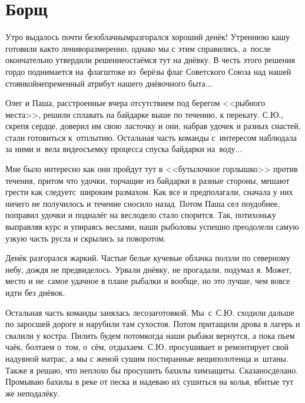 \chapter{Борщ} 
\vepsianrose

Утро выдалось почти безоблачным\mdash разгорался хороший денёк! Утреннюю кашу готовили как\sdash то лениво\sdash размеренно, однако мы с этим справились, а~после окончательно утвердили решение\mdash остаёмся тут на днёвку. В честь этого решения гордо поднимается на~флагштоке из~берёзы флаг Советского Союза над нашей стоянкой\mdash непременный атрибут нашего днёвочного быта$\ldots$ 

Олег и Паша, расстроенные вчера отсутствием под берегом <<рыбного места>>, решили сплавать на байдарке выше по течению, к перекату. С.Ю., скрепя сердце, доверил им свою ласточку и они, набрав удочек и разных снастей, стали готовиться к~отплытию. Остальная часть команды с~интересом наблюдала за ними и~вела видеосъемку процесса спуска байдарки на~воду$\ldots$
 
Мне было интересно как они пройдут тут в <<бутылочное горлышко>> против течения, притом что удочки, торчащие из байдарки в разные стороны, мешают грести как следует\mdash с~широким размахом. Как все и предполагали, сначала у них ничего не получилось и течение сносило назад. Потом Паша сел поудобнее, поправил удочки и подналёг на весло\mdash дело стало спорится. Так, потихоньку выправляя курс и упираясь веслами, наши рыболовы успешно преодолели самую узкую часть русла и скрылись за поворотом.

Денёк разгорался жаркий. Частые белые кучевые облачка ползли по северному небу, дождя не предвиделось. Урвали днёвку, не прогадали, подумал я. Может, место и не~самое удачное в плане рыбалки и вообще, но это лучше, чем вовсе идти без днёвок.

Остальная часть команды занялась лесозаготовкой. Мы~с~С.Ю. сходили дальше по заросшей дороге и нарубили там сухостоя. Потом притащили дрова в лагерь и свалили у костра. Пилить будем потом\mdash когда наши рыбаки вернутся, а пока пьем чаёк, болтаем о~том, о~сём, отдыхаем. С.Ю. просушивает и ремонтирует свой надувной матрас, а мы с женой сушим постиранные вещи\mdash полотенца и~штаны. Также я решаю, что неплохо бы просушить бахилы химзащиты. Сказано\mdash сделано. Промываю бахилы в реке от песка и надеваю их сушиться на колья, вбитые тут же неподалёку. 

